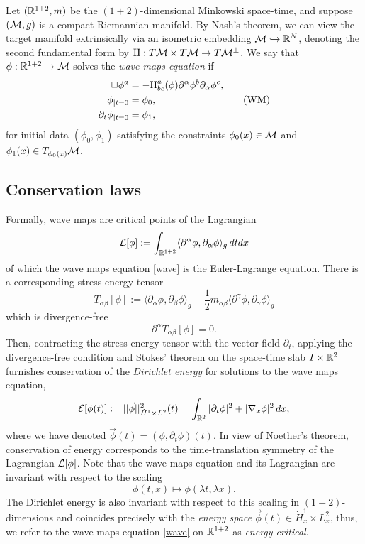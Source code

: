 Let $(\mathbb R^{1 + 2}, m)$ be the $(1 + 2)$-dimensional Minkowski space-time, and suppose $(\mathcal M, g)$ is a compact Riemannian manifold. By Nash's theorem, we can view the target manifold extrinsically via an isometric embedding $\mathcal M \hookrightarrow \mathbb R^N$, denoting the second fundamental form by $\mathrm{II} : T\mathcal M \times T\mathcal M \to T \mathcal M^\perp$. We say that $\phi : \mathbb R^{1 + 2} \to \mathcal M$ solves the \emph{wave maps equation} if 
\begin{equation}
	\begin{split}
		\Box \phi^a 
			&= - \mathrm{II}^a_{bc} (\phi)  \partial^\alpha \phi^b \partial_\alpha \phi^c, \\
		\phi_{|t = 0}
			&= \phi_0 ,\\
		\partial_t \phi_{|t = 0}
			&= \phi_1,	
	\end{split}
	\label{eq:wave}
	\tag{WM}
\end{equation}
for initial data $(\phi_0, \phi_1)$ satisfying the constraints $\phi_0 (x) \in \mathcal M$ and $\phi_1 (x) \in T_{\phi_0 (x)} \mathcal M$. 

\subsection{Conservation laws}

Formally, wave maps are critical points of the Lagrangian
	\[ \mathcal L [\phi] := \int_{\mathbb R^{1 + 2}} \langle\partial^\alpha \phi, \partial_\alpha \phi \rangle_g \, dt dx \]
of which the wave maps equation \eqref{wave} is the Euler-Lagrange equation. There is a corresponding stress-energy tensor 
	\[ 
		T_{\alpha\beta} [\phi] := \langle \partial_\alpha \phi, \partial_\beta \phi \rangle_g  - \frac12 m_{\alpha \beta} \langle \partial^\gamma \phi, \partial_\gamma \phi \rangle_g
	 \]
which is divergence-free
	\[ \partial^\alpha T_{\alpha \beta} [\phi] = 0. \]
Then, contracting the stress-energy tensor with the vector field $\partial_t$, applying the divergence-free condition and Stokes' theorem on the space-time slab $I \times \mathbb R^2$ furnishes conservation of the \emph{Dirichlet energy} for solutions to the wave maps equation, 
	\[ \mathcal E[\phi (t)] := ||\vec \phi||_{\dot H^1 \times L^2}^2 (t) = \int_{\mathbb R^2} |\partial_t \phi|^2 + |\nabla_x \phi|^2 \, dx , \]
where we have denoted $\vec \phi (t) = (\phi, \partial_t \phi) (t)$. In view of Noether's theorem, conservation of energy corresponds to the time-translation symmetry of the Lagrangian $\mathcal L [\phi]$. Note that the wave maps equation and its Lagrangian are invariant with respect to the scaling 
	\[ \phi(t, x) \mapsto \phi(\lambda t, \lambda x). \]
The Dirichlet energy is also invariant with respect to this scaling in $(1 + 2)$-dimensions and coincides precisely with the \emph{energy space} $\vec \phi (t) \in \dot H^1_x \times L^2_x$, thus, we refer to the wave maps equation \eqref{wave} on $\mathbb R^{1 + 2}$ as \emph{energy-critical}. 	


